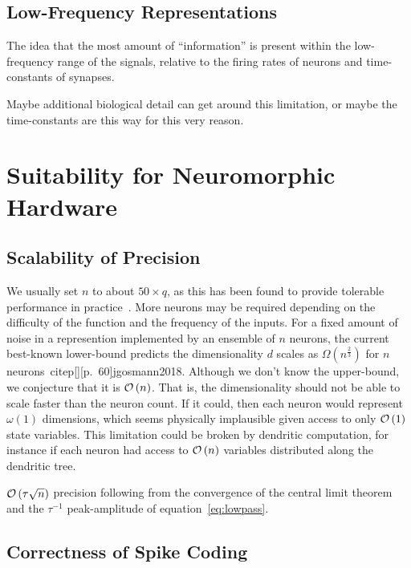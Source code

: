 \subsection{Low-Frequency Representations}

The idea that the most amount of ``information'' is present within the low-frequency range of the signals, relative to the firing rates of neurons and time-constants of synapses.

Maybe additional biological detail can get around this limitation, or maybe the time-constants are this way for this very reason.


\section{Suitability for Neuromorphic Hardware}
\label{sec:nef-suitability}

\citep{boahen2017neuromorph}

\subsection{Scalability of Precision}
\label{sec:scalability}

We usually set $n$ to about $50 \times q$, as this has been found to provide tolerable performance in practice~\citep{braindrop2019}. 
More neurons may be required depending on the difficulty of the function and the frequency of the inputs.
For a fixed amount of noise in a represention implemented by an ensemble of $n$ neurons, the current best-known lower-bound predicts the dimensionality $d$ scales as $\Omega \left( n^{\frac{2}{3}} \right)$ for $n$ neurons~citep[][p.~60]{jgosmann2018}.
Although we don't know the upper-bound, we conjecture that it is $\mathcal{O}\left({n}\right)$.
That is, the dimensionality should not be able to scale faster than the neuron count.
If it could, then each neuron would represent $\omega(1)$ dimensions, which seems physically implausible given access to only $\mathcal{O}\left({1}\right)$ state variables.
This limitation could be broken by dendritic computation, for instance if each neuron had access to $\mathcal{O}\left({n}\right)$ variables distributed along the dendritic tree.

$\mathcal{O}\left({ \tau \sqrt{n} }\right)$ precision following from the convergence of the central limit theorem~\citep[CLT;][]{berry1941accuracy, esseen1942liapunov} and the $\tau^{-1}$ peak-amplitude of equation~\ref{eq:lowpass}.

\subsection{Correctness of Spike Coding}
\label{sec:spike-coding}

